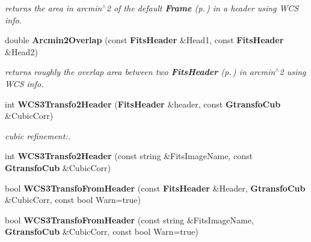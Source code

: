 \begin{CompactItemize}
\begin{CompactList}\small\item\em returns the area in arcmin$^\wedge$2 of the default {\bf Frame} {\rm (p.\,\pageref{class_frame})} in a header using WCS info.\item\end{CompactList}\item 
{}
double {\bf Arcmin2Overlap} (const {\bf Fits\-Header} \&Head1, const {\bf Fits\-Header} \&Head2)\label{wcsutils_h_a19}

\begin{CompactList}\small\item\em returns roughly the overlap area between two {\bf Fits\-Header} {\rm (p.\,\pageref{class_fitsheader})} in arcmin$^\wedge$2 using WCS info.\item\end{CompactList}\item 
{}
int {\bf WCS3Transfo2Header} ({\bf Fits\-Header} \&header, const {\bf Gtransfo\-Cub} \&Cubic\-Corr)\label{wcsutils_h_a20}

\begin{CompactList}\small\item\em cubic refinement:.\item\end{CompactList}\item 
{}
int {\bf WCS3Transfo2Header} (const string \&Fits\-Image\-Name, const {\bf Gtransfo\-Cub} \&Cubic\-Corr)\label{wcsutils_h_a21}

\item 
{}
bool {\bf WCS3Transfo\-From\-Header} (const {\bf Fits\-Header} \&Header, {\bf Gtransfo\-Cub} \&Cubic\-Corr, const bool Warn=true)\label{wcsutils_h_a22}

\item 
{}
bool {\bf WCS3Transfo\-From\-Header} (const string \&Fits\-Image\-Name, {\bf Gtransfo\-Cub} \&Cubic\-Corr, const bool Warn=true)\label{wcsutils_h_a23}


\end{CompactItemize}
